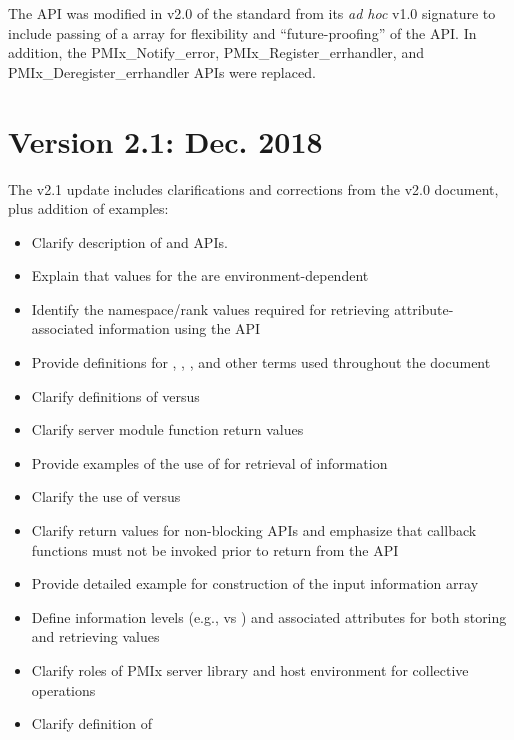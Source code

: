 {The  \ac{API} was modified in v2.0 of the standard from its \textit{ad hoc} v1.0 signature to include passing of a  array for flexibility and ``future-proofing'' of the \ac{API}.
In addition, the PMIx_Notify_error, PMIx_Register_errhandler, and PMIx_Deregister_errhandler \acp{API} were replaced.

\section{Version 2.1: Dec. 2018}

The v2.1 update includes clarifications and corrections from the v2.0 document, plus addition of examples:

\begin{itemize}
    \item Clarify description of  and  \acp{API}.
    \item Explain that values for the  are environment-dependent
    \item Identify the namespace/rank values required for retrieving attribute-associated information using the  \ac{API}
    \item Provide definitions for , , , and other terms used throughout the document
    \item Clarify definitions of  versus 
    \item Clarify server module function return values
    \item Provide examples of the use of  for retrieval of information
    \item Clarify the use of  versus 
    \item Clarify return values for non-blocking \acp{API} and emphasize that callback functions must not be invoked prior to return from the \ac{API}
    \item Provide detailed example for construction of the  input information array
    \item Define information levels (e.g.,  vs ) and associated attributes for both storing and retrieving values
    \item Clarify roles of \ac{PMIx} server library and host environment for collective operations
    \item Clarify definition of 
\end{itemize}

}
